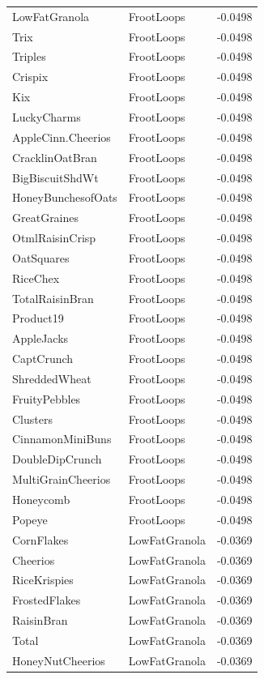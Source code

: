\begin{longtable}{llr}
LowFatGranola & FrootLoops & -0.0498 \\
Trix & FrootLoops & -0.0498 \\
Triples & FrootLoops & -0.0498 \\
Crispix & FrootLoops & -0.0498 \\
Kix & FrootLoops & -0.0498 \\
LuckyCharms & FrootLoops & -0.0498 \\
AppleCinn.Cheerios & FrootLoops & -0.0498 \\
CracklinOatBran & FrootLoops & -0.0498 \\
BigBiscuitShdWt & FrootLoops & -0.0498 \\
HoneyBunchesofOats & FrootLoops & -0.0498 \\
GreatGraines & FrootLoops & -0.0498 \\
OtmlRaisinCrisp & FrootLoops & -0.0498 \\
OatSquares & FrootLoops & -0.0498 \\
RiceChex & FrootLoops & -0.0498 \\
TotalRaisinBran & FrootLoops & -0.0498 \\
Product19 & FrootLoops & -0.0498 \\
AppleJacks & FrootLoops & -0.0498 \\
CaptCrunch & FrootLoops & -0.0498 \\
ShreddedWheat & FrootLoops & -0.0498 \\
FruityPebbles & FrootLoops & -0.0498 \\
Clusters & FrootLoops & -0.0498 \\
CinnamonMiniBuns & FrootLoops & -0.0498 \\
DoubleDipCrunch & FrootLoops & -0.0498 \\
MultiGrainCheerios & FrootLoops & -0.0498 \\
Honeycomb & FrootLoops & -0.0498 \\
Popeye & FrootLoops & -0.0498 \\
CornFlakes & LowFatGranola & -0.0369 \\
Cheerios & LowFatGranola & -0.0369 \\
RiceKrispies & LowFatGranola & -0.0369 \\
FrostedFlakes & LowFatGranola & -0.0369 \\
RaisinBran & LowFatGranola & -0.0369 \\
Total & LowFatGranola & -0.0369 \\
HoneyNutCheerios & LowFatGranola & -0.0369 \\

\end{longtable}
